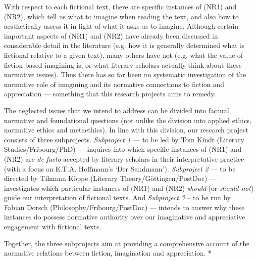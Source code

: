 \noindent With respect to each fictional text, there are specific instances of (NR1) and (NR2), which tell us what to imagine when reading the text, and also how to aesthetically assess it in light of what it asks us to imagine. Although certain important aspects of (NR1) and (NR2) have already been discussed in considerable detail in the literature (e.g. how it is generally determined what is fictional relative to a given text), many others have not (e.g. what the value of fiction-based imagining is, or what literary scholars actually think about these normative issues). Thus there has so far been no systematic investigation of the normative role of imagining and its normative connections to fiction and appreciation --- something that this research projects aims to remedy. 

The neglected issues that we intend to address can be divided into factual, normative and foundational questions (not unlike the division into applied ethics, normative ethics and metaethics). In line with this division, our research project consists of three subprojects. \emph{Subproject 1} --- to be led by Tom Kindt (Literary Studies/Fribourg/PhD) --- inquires into which specific instances of (NR1) and (NR2) are \emph{de facto} accepted by literary scholars in their interpretative practice (with a focus on E.T.A. Hoffmann's `Der Sandmann'). \emph{Subproject 2} --- to be directed by Tilmann K\"oppe (Literary Theory/G\"ottingen/PostDoc) --- investigates which particular instances of (NR1) and (NR2) \emph{should} (or \emph{should not}) guide our interpretation of fictional texts. And \emph{Subproject 3} -- to be run by Fabian Dorsch (Philosophy/Fribourg/PostDoc) --- intends to answer why these instances do possess normative authority over our imaginative and appreciative engagement with fictional texts. 

Together, the three subprojects aim at providing a comprehensive account of the normative relations between fiction, imagination and appreciation. *

\pagebreak